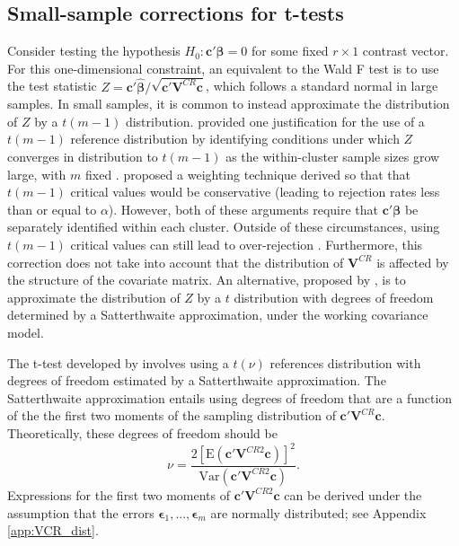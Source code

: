 \documentclass[12pt]{article}\usepackage[]{graphicx}\usepackage[]{color}
\newcommand{\E}{\text{E}}
\newcommand{\Var}{\text{Var}}
\newcommand{\bm}{\mathbf}
\newcommand{\bs}{\boldsymbol}
\begin{document}
\subsection{Small-sample corrections for t-tests}

Consider testing the hypothesis $H_0: \bm{c}'\bs\beta = 0$ for some fixed $r \times 1$ contrast vector. 
For this one-dimensional constraint, an equivalent to the Wald F test is to use the test statistic $Z = \bm{c}'\bs{\hat\beta} / \sqrt{\bm{c}'\bm{V}^{CR}\bm{c}}$, which follows a standard normal in large samples. 
In small samples, it is common to instead approximate the distribution of $Z$ by a $t(m - 1)$ distribution. 
\citet{Hansen2007asymptotic} provided one justification for the use of a $t(m-1)$ reference distribution by identifying conditions under which $Z$ converges in distribution to $t(m-1)$ as the within-cluster sample sizes grow large, with $m$ fixed \citep[see also][]{Donald2007inference}. 
\citet{Ibragimov2010tstatistic} proposed a weighting technique derived so that that $t(m-1)$ critical values would be conservative (leading to rejection rates less than or equal to $\alpha$).
However, both of these arguments require that $\bm{c}'\bs\beta$ be separately identified within each cluster. 
Outside of these circumstances, using $t(m-1)$ critical values can still lead to over-rejection \citep{Cameron2015practitioners}. 
Furthermore, this correction does not take into account that the distribution of $\bm{V}^{CR}$ is affected by the structure of the covariate matrix. 
An alternative, proposed by \citet{Bell2002bias}, is to approximate the distribution of $Z$ by a $t$ distribution with degrees of freedom determined by a Satterthwaite approximation, under the working covariance model.

The t-test developed by \citet{Bell2002bias} involves using a $t(\nu)$ references distribution with degrees of freedom estimated by a Satterthwaite approximation.
The Satterthwaite approximation \citep{Satterthwaite1946approximate} entails using degrees of freedom that are a function of the the first two moments of the sampling distribution of $\bm{c}' \bm{V}^{CR} \bm{c}$.
Theoretically, these degrees of freedom should be 
\begin{equation}
\label{eq:nu_Satterthwaite}
\nu = \frac{2\left[\E\left(\bm{c}'\bm{V}^{CR2}\bm{c}\right)\right]^2}{\Var\left(\bm{c}'\bm{V}^{CR2}\bm{c}\right)}.
\end{equation}
Expressions for the first two moments of $\bm{c}'\bm{V}^{CR2}\bm{c}$ can be derived under the assumption that the errors $\bs\epsilon_1,...,\bs\epsilon_m$ are normally distributed; see Appendix \ref{app:VCR_dist}. 
\end{document}
